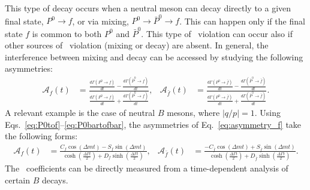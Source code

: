 This type of decay occurs when a neutral meson can decay directly to a given final state, $P^0\to f$, or via mixing, $P^0\to \bar P^0 \to f$. 
This can happen only if the final state $f$ is common to both $P^0$ and $\bar P^0$.
This type of \CP~violation can occur also if other sources of \CP~violation (mixing or decay) are absent.
In general, the interference between mixing and decay can be accessed by studying the following asymmetries:
\begin{align}
	\label{eq:asymmetry_f}
	\mathcal A_f(t) &= \frac{ \frac{d\Gamma(P^0\to f)}{dt} - \frac{d\Gamma(\bar P^0\to f)}{dt} }{ \frac{d\Gamma(P^0\to f)}{dt} + \frac{d\Gamma(\bar P^0\to f)}{dt}}, &
	\mathcal A_{\bar f}(t) &= \frac{ \frac{d\Gamma(P^0\to \bar f)}{dt} - \frac{d\Gamma(\bar P^0\to \bar f)}{dt} }{ \frac{d\Gamma(P^0\to \bar f)}{dt} + \frac{d\Gamma(\bar P^0\to \bar f)}{dt}}.
\end{align}
A relevant example is the case of neutral $B$ mesons, where $|q/p|=1$. Using Eqs.~\ref{eq:P0tof}--\ref{eq:P0bartofbar}, the asymmetries of Eq.~\ref{eq:asymmetry_f} take the following forms:
\begin{align}
	\mathcal A_f(t) &= \frac{C_f \cos(\Delta m t) - S_f \sin(\Delta m t)}{\cosh\left(\frac{\Delta\Gamma t}{2}\right) + D_f \sinh\left(\frac{\Delta\Gamma t}{2}\right)}, &
	\mathcal A_{\bar f}(t) &= \frac{-C_{\bar f} \cos(\Delta m t) + S_{\bar f} \sin(\Delta m t)}{\cosh\left(\frac{\Delta\Gamma t}{2}\right) + D_{\bar f} \sinh\left(\frac{\Delta\Gamma t}{2}\right)}.
\end{align}
The \CP~coefficients can be directly measured from a time-dependent analysis of certain $B$ decays. 
